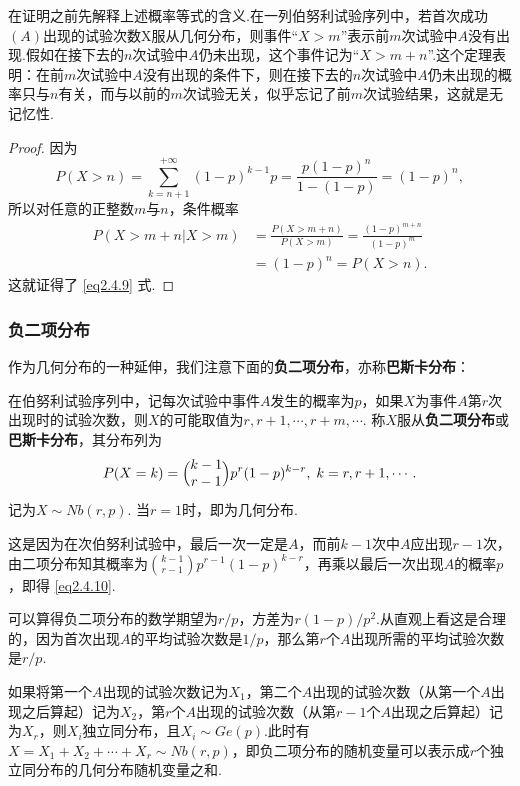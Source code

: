 在证明之前先解释上述概率等式的含义.在一列伯努利试验序列中，若首次成功$(A)$出现的试验次数X服从几何分布，则事件“$X>m$”表示前$m$次试验中$A$没有出现.假如在接下去的$n$次试验中$A$仍未出现，这个事件记为“$X>m+n$”.这个定理表明：在前$m$次试验中$A$没有出现的条件下，则在接下去的$n$次试验中$A$仍未出现的概率只与$n$有关，而与以前的$m$次试验无关，似乎忘记了前$m$次试验结果，这就是无记忆性.
\begin{proof}
  因为
  \[
    P(X > n) = \sum_{k=n+1}^{+\infty}(1-p)^{k-1}p = \frac{p(1-p)^n}{1-(1-p)} = (1-p)^n,
  \]
  所以对任意的正整数$m$与$n$，条件概率
  \begin{align*}
    P(X > m + n | X > m) & = \frac{P(X>m+n)}{P(X>m)} = \frac{(1-p)^{m+n}}{(1-p)^m} \\
    & = (1 - p)^n = P(X > n).
  \end{align*}
  这就证得了 \eqref{eq2.4.9} 式.
\end{proof}

\subsubsection{负二项分布}
作为几何分布的一种延伸，我们注意下面的\textbf{负二项分布}，亦称\textbf{巴斯卡分布}：

在伯努利试验序列中，记每次试验中事件$A$发生的概率为$p$，如果$X$为事件$A$第$r$次出现时的试验次数，则$X$的可能取值为$r,r+1,\cdots,r+m,\cdots$. 称$X$服从\textbf{负二项分布}或\textbf{巴斯卡分布}，其分布列为
\begin{equation}\label{eq2.4.10}
  P(X = k) = \Binom{k-1}{r-1} p^r(1-p)^{k-r},\; k=r,r+1,\cdots.
\end{equation}
记为$X\sim Nb(r,p)$. 当$r=1$时，即为几何分布.

这是因为在次伯努利试验中，最后一次一定是$A$，而前$k-1$次中$A$应出现$r-1$次，由二项分布知其概率为$\binom{k-1}{r-1}p^{r-1}(1-p)^{k-r}$，再乘以最后一次出现$A$的概率$p$，即得 \eqref{eq2.4.10}.

可以算得负二项分布的数学期望为$r/p$，方差为$r(1-p)/p^2$.从直观上看这是合理的，因为首次出现$A$的平均试验次数是$1/p$，那么第$r$个$A$出现所需的平均试验次数是$r/p$.

如果将第一个$A$出现的试验次数记为$X_1$，第二个$A$出现的试验次数（从第一个$A$出现之后算起）记为$X_2$，第$r$个$A$出现的试验次数（从第$r-1$个$A$出现之后算起）记为$X_r$，则$X_i$独立同分布，且$X_i\sim Ge(p)$.此时有$X=X_1+X_2+\cdots+X_r\sim Nb(r,p)$，即负二项分布的随机变量可以表示成$r$个独立同分布的几何分布随机变量之和.

